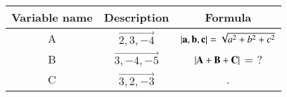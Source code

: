 \begin{tabular}[12pt]{|c|c|c|}
    \hline
    \textbf{Variable name} & \textbf{Description} & \textbf{Formula}\\ 
    \hline
		A & $\vec{2,3,-4}$ &  $\left\vert\mathbf{a,b,c}\right\vert=\sqrt{a^2+b^2+c^2}$\\
    \hline 
                B & $\vec{3,-4,-5}$ & $\left\vert\mathbf{A+B+C}\right\vert$ = ? \\
    \hline
		C & $\vec{3,2,-3}$ & .  \\
    \hline   
\end{tabular}

